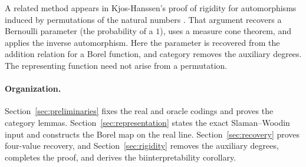 A related method appears in Kjos-Hanssen's proof of rigidity for
automorphisms induced by permutations of the natural numbers
\cite[Theorem~20, arXiv version]{KjosHanssen2018}.
That argument recovers a Bernoulli parameter (the probability of
a $1$), uses a measure cone theorem, and applies the inverse
automorphism. Here the
parameter is recovered from the addition relation for a Borel
function, and category removes the auxiliary degrees. The
representing function need not arise from a permutation.

\paragraph{Organization.}
Section~\ref{sec:preliminaries} fixes the real and oracle codings
and proves the category lemmas. Section~\ref{sec:representation}
states the exact Slaman--Woodin input and constructs the Borel map
on the real line. Section~\ref{sec:recovery} proves four-value
recovery, and Section~\ref{sec:rigidity} removes the auxiliary
degrees, completes the proof, and derives the biinterpretability
corollary.
